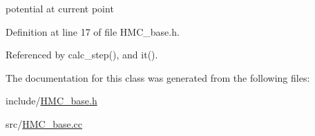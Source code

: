 potential at current point 



Definition at line 17 of file H\-M\-C\-\_\-base.\-h.



Referenced by calc\-\_\-step(), and it().



The documentation for this class was generated from the following files\-:\begin{DoxyCompactItemize}
\item 
include/\hyperlink{_h_m_c__base_8h}{H\-M\-C\-\_\-base.\-h}\item 
src/\hyperlink{_h_m_c__base_8cc}{H\-M\-C\-\_\-base.\-cc}\end{DoxyCompactItemize}
